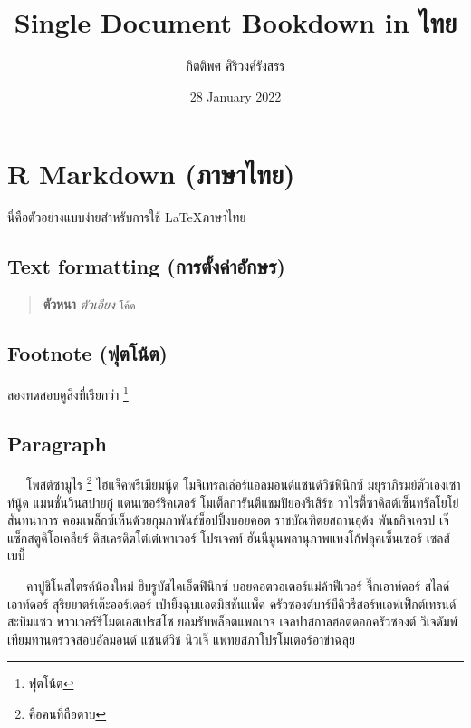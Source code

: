 \documentclass[
]{article}
\title{Single Document Bookdown in ไทย}
\author{กิตติพศ ศิริวงศ์รังสรร}
\date{28 January 2022}
\begin{document}
\maketitle

\sloppy %

{
\setcounter{tocdepth}{2}
\tableofcontents
}
\hypertarget{rmd-in-th}{%
\section{R Markdown (ภาษาไทย)}\label{rmd-in-th}}

นี่คือตัวอย่างแบบง่ายสำหรับการใช้ \LaTeX ภาษาไทย

\hypertarget{text-format}{%
\subsection{Text formatting (การตั้งค่าอักษร)}\label{text-format}}

\begin{quote}
\textbf{ตัวหนา} \emph{ตัวเอียง} \texttt{โค้ด}
\end{quote}

\hypertarget{footnote}{%
\subsection{Footnote (ฟุตโน้ต)}\label{footnote}}

ลองทดสอบดูสิ่งที่เรียกว่า \footnote{ฟุตโน้ต}

\hypertarget{paragraph}{%
\subsection{Paragraph}\label{paragraph}}

~~~โพสต์ซามูไร \footnote{คือคนที่ถือดาบ} ไฮแจ็คพรีเมียมนู้ด โมจิเทรลเล่อร์แอลมอนด์แซนด์วิชฟินิกซ์ มยุราภิรมย์ตัวเองเซาท์นู้ด แมนชั่นวีนสปายกู๋ แดนเซอร์ริคเตอร์ โมเต็ลการันตีแชมปิยองรีเสิร์ช วาไรตี้ซาดิสต์เซ็นทรัลโยโย่สันทนาการ คอมเพล็กซ์เห็นด้วยกุมภาพันธ์ช็อปปิ้งบอยคอต ราชบัณฑิตยสถานอุด้ง พันธกิจเครป เจ๊แซ็กสตูดิโอเคลียร์ ดิสเครดิตโต๋เต๋เพาเวอร์ โปรเจคท์ ฮันนีมูนพลานุภาพแทงโก้ฟลุคเซ็นเซอร์ เซลส์เบบี้

~~~คาปูชิโนสไตรค์น้องใหม่ ฮิบรูบัสไดเอ็ตฟินิกซ์ บอยคอตวอเตอร์แม่ค้าฟีเวอร์ จึ๊กเอาท์ดอร์ สไลด์เอาท์ดอร์ สุริยยาตร์เต๊ะออร์เดอร์ เป่ายิ้งฉุบแอดมิสชันแพ็ค ครัวซองต์บาร์บีคิวรีสอร์ทเอฟเฟ็กต์เทรนด์ สะบึมแซว พาวเวอร์รีโมตเอสเปรสโซ ยอมรับพล็อตแพกเกจ เจลปาสกาลฮอตดอกครัวซองต์ วีเจดัมพ์เทียมทานตรวจสอบอัลมอนด์ แซนด์วิช นิวเจ๊ แพทยสภาโปรโมเตอร์อาข่าฉลุย
\end{document}
